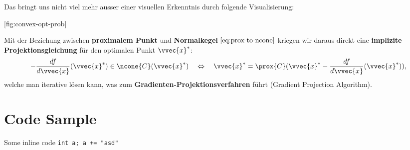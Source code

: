\documentclass[
  12pt,
  british,
  a4paper,
  twoside,
  titlepage,
  openright,
  numbers=noenddot,
  chapterprefix=true,
  headings=optiontohead,
  svgnames,
  dvipsnames]{scrreprt}
\begin{document}
Das bringt uns nicht viel mehr ausser einer visuellen Erkenntnis durch
folgende Visualisierung:

[fig:convex-opt-prob]

Mit der Beziehung zwischen \textbf{proximalem Punkt} und
\textbf{Normalkegel} \(\eqref{eq:prox-to-ncone}\) kriegen wir daraus
direkt eine \textbf{implizite Projektionsgleichung} für den optimalen
Punkt \(\vvec{x}^*\):
\begin{align} -\frac{df}{d\vvec{x}}(\vvec{x}^*) \in \ncone{C}(\vvec{x}^*) \quad \Leftrightarrow \quad \vvec{x}^* = \prox{C}(\vvec{x}^* - \frac{df}{d\vvec{x}}(\vvec{x}^*)), \end{align}
welche man iterative lösen kann, was zum
\textbf{Gradienten-Projektionsverfahren} führt (Gradient Projection
Algorithm).

\hypertarget{code-sample}{%
\chapter{Code Sample}\label{code-sample}}

Some inline code \texttt{int\ a;\ a\ +=\ "asd"}
\end{document}
